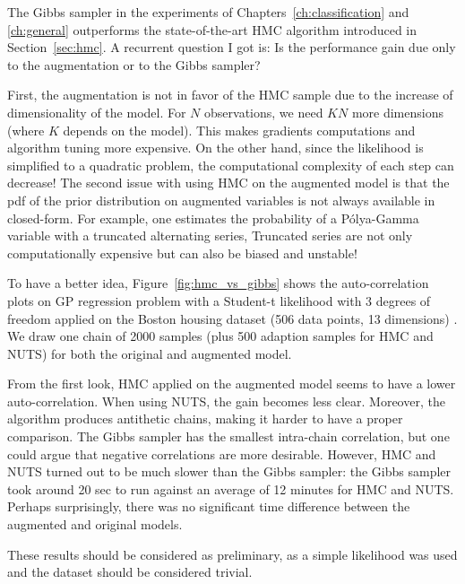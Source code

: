 The Gibbs sampler in the experiments of Chapters~\ref{ch:classification} and \ref{ch:general} outperforms the state-of-the-art \ac{HMC} algorithm introduced in Section~\ref{sec:hmc}.
A recurrent question I got is:
Is the performance gain due only to the augmentation or to the Gibbs sampler?

First, the augmentation is not in favor of the \ac{HMC} sample due to the increase of dimensionality of the model.
For $N$ observations, we need $KN$ more dimensions (where $K$ depends on the model).
This makes gradients computations and algorithm tuning more expensive.
On the other hand, since the likelihood is simplified to a quadratic problem, the computational complexity of each step can decrease!
The second issue with using \ac{HMC} on the augmented model is that the \ac{pdf} of the prior distribution on augmented variables is not always available in closed-form.
For example, one estimates the probability of a P\'olya-Gamma variable with a truncated alternating series,
Truncated series are not only computationally expensive but can also be biased and unstable!

To have a better idea, Figure~\ref{fig:hmc_vs_gibbs} shows the auto-correlation plots on \ac{GP} regression problem with a Student-t likelihood with 3 degrees of freedom applied on the Boston housing dataset (506 data points, 13 dimensions) \cite{harrison1978hedonic}.
We draw one chain of 2000 samples (plus 500 adaption samples for \ac{HMC} and \ac{NUTS}) for both the original and augmented model.

From the first look, \ac{HMC} applied on the augmented model seems to have a lower auto-correlation.
When using \ac{NUTS}, the gain becomes less clear.
Moreover, the algorithm produces antithetic chains, making it harder to have a proper comparison.
The Gibbs sampler has the smallest intra-chain correlation, but one could argue that negative correlations are more desirable.
However, \ac{HMC} and \ac{NUTS} turned out to be much slower than the Gibbs sampler:
the Gibbs sampler took around 20 sec to run against an average of 12 minutes for \ac{HMC} and \ac{NUTS}.
Perhaps surprisingly, there was no significant time difference between the augmented and original models.

These results should be considered as preliminary, as a simple likelihood was used and the dataset should be considered trivial.

